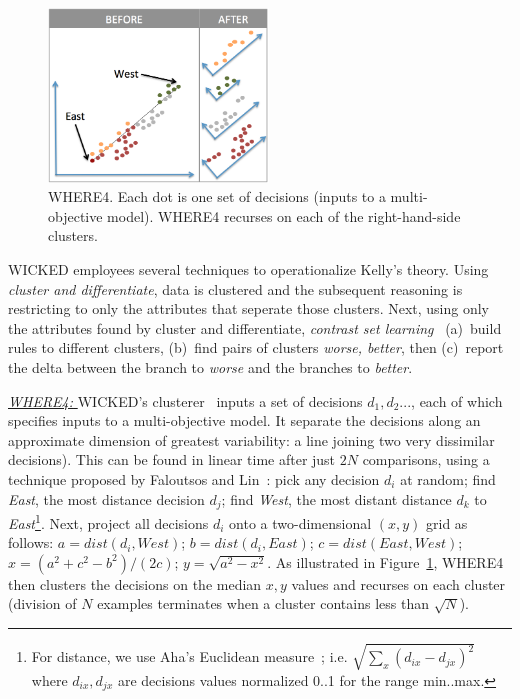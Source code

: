 \documentclass[runningheads]{llncs}
\newcommand{\fig}[1]{Figure~\ref{fig:#1}}
\begin{document}
\begin{figure}
\includegraphics[width=2.3in]{4WAY.png}
\caption{WHERE4. Each dot is
one set of decisions (inputs to a multi-objective model).
WHERE4 recurses on each of the right-hand-side clusters.
}\label{fig:4WAY}
\end{figure}
WICKED employees several techniques to operationalize
Kelly's theory.  Using {\em cluster and
  differentiate}, data is clustered and the
subsequent reasoning is restricting to only the
attributes that seperate those clusters. Next,
using only the attributes found by cluster and differentiate,
 {\em contrast set learning}~\cite{webb09} 
(a)~build rules to different clusters,
(b)~find pairs of clusters {\em worse, better}, then
(c)~report the delta between the branch to {\em worse} and
the branches to {\em better}.

\underline{{\em WHERE4: }}
WICKED's clusterer~\cite{me12d}
inputs a set of decisions
$d_1,d_2...$, each of which specifies
inputs to a multi-objective model.
It separate the decisions along an
approximate dimension
of greatest variability: a line joining two very dissimilar
decisions). This can be found in linear
time after just $2N$ comparisons,
using a technique proposed by Faloutsos and Lin~\cite{Faloutsos1995}: 
 pick any decision $d_i$ at random; find {\em East},
the most distance decision $d_j$; find {\em West}, the most distant 
distance $d_k$ to {\em East}\footnote{
 For distance, we use Aha's Euclidean measure~\cite{aha91};
i.e. $\sqrt{\sum_x(d_{ix}-d_{jx})^2}$ where $d_{ix},d_{jx}$ 
are decisions values normalized 0..1 for the range min..max.}.
Next, project all  decisions $d_i$ onto a two-dimensional
$(x,y)$ grid as follows:  
$a=\mathit{dist}(d_i,\mathit{West})$;
$b=\mathit{dist}(d_i,\mathit{East})$;
$c=\mathit{dist}(\mathit{East},\mathit{West})$;
$x=(a^2 + c^2 - b^2)/(2c)$;
$y=\sqrt{a^2 - x^2}$.
As illustrated in \fig{4WAY},
WHERE4 then clusters the decisions on the median $x,y$ values
and recurses on each cluster (division of $N$ examples terminates
when a cluster contains less than $\sqrt{N}$).
\end{document}
